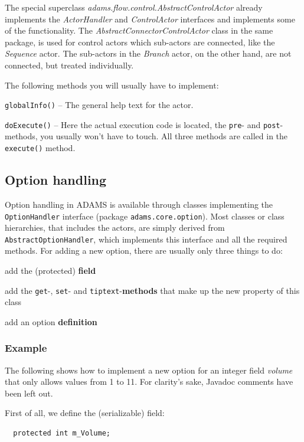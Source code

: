 The special superclass \textit{adams.flow.control.AbstractControlActor} already
implements the \textit{ActorHandler} and \textit{ControlActor} interfaces and
implements some of the functionality. The \textit{AbstractConnectorControlActor}
class in the same package, is used for control actors which sub-actors are
connected, like the \textit{Sequence} actor. The sub-actors in the
\textit{Branch} actor, on the other hand, are not connected, but treated
individually.

The following methods you will usually have to implement:
\begin{tight_itemize}
	\item \texttt{globalInfo()} -- The general help text for the actor.
	\item \texttt{doExecute()} -- Here the actual execution code is located, the
	\texttt{pre}- and \texttt{post}- methods, you usually won't have to touch. All
	three methods are called in the \texttt{execute()} method.
\end{tight_itemize}

\subsection{Option handling}
Option handling in ADAMS is available through classes implementing the
\texttt{OptionHandler} interface (package \texttt{adams.core.option}). Most
classes or class hierarchies, that includes the actors, are simply
derived from \texttt{AbstractOptionHandler}, which implements this
interface and all the required methods. For adding a new option, there
are usually only three things to do:
\begin{tight_enumerate}
	\item add the (protected) \textbf{field}
	\item add the \texttt{get}-, \texttt{set}- and
	\texttt{tiptext}-\textbf{methods} that make up the new property of this class
	\item add an option \textbf{definition}
\end{tight_enumerate}

\subsubsection{Example}
The following shows how to implement a new option for an integer field
\textit{volume} that only allows values from 1 to 11. For clarity's sake,
Javadoc comments have been left out. 

\noindent First of all, we define the (serializable) field:
{\small
\begin{verbatim}
  protected int m_Volume;
\end{verbatim}
}

